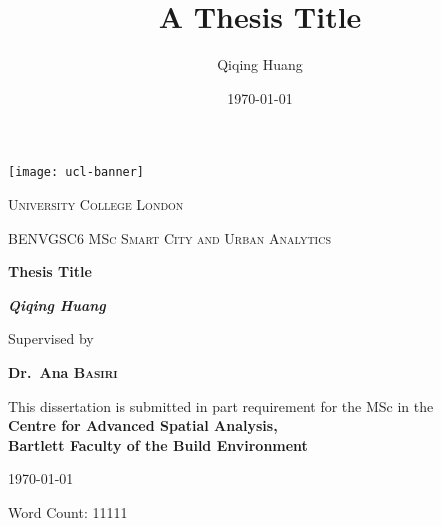 \documentclass[12pt,a4paper]{report}
\begin{document}
\title{A Thesis Title}
\author{Qiqing Huang}
\date{\today}
\begin{titlepage}
    \centering
    \vspace*{-6.55\baselineskip}
    \hspace*{-0.27\textwidth}
    \texttt{[image: ucl-banner]}
    \par\vspace*{5\baselineskip}
    {\scshape\LARGE University College London \par}
	\vspace{0.5cm}
	{\scshape\large BENVGSC6 MSc Smart City and Urban Analytics\par}
	\vspace{2cm}
	{\huge\bfseries Thesis Title\par}
	\vspace{2cm}
	{\Large\bfseries\itshape Qiqing Huang\par}
	\vspace{2cm}
	{Supervised by\par}
    {\bfseries Dr.~Ana \textsc{Basiri}\par}
    \vspace{0.5cm}
    {This dissertation is
    submitted in part requirement for the MSc 
    in the \\
    \bfseries{Centre for Advanced
    Spatial Analysis}, \\
    \bfseries{Bartlett Faculty of the
    Build Environment}\par}
	\vfill
    {\today\par}
    {Word Count: 11111\par}
\end{titlepage}



\tableofcontents
\listoffigures
\listoftables







 

\clearpage
\newpage

\end{document}
